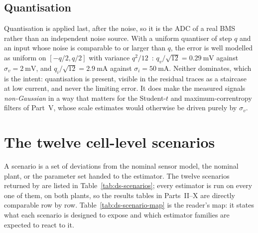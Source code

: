 \subsection{Quantisation}

Quantisation is applied last, after the noise, so it is the ADC of a real BMS rather than an
independent noise source. With a uniform quantiser of step $q$ and an input whose noise is
comparable to or larger than $q$, the error is well modelled as uniform on $[-q/2,q/2]$ with
variance $q^2/12$~\cite{widrow2008quantization}: $q_v/\sqrt{12} = \SI{0.29}{\milli\volt}$ against
$\sigma_v = \SI{2}{\milli\volt}$, and $q_i/\sqrt{12} = \SI{2.9}{\milli\ampere}$ against
$\sigma_i = \SI{50}{\milli\ampere}$. Neither dominates, which is the intent: quantisation is
present, visible in the residual traces as a staircase at low current, and never the limiting error.
It does make the measured signals \emph{non-Gaussian} in a way that matters for the Student-$t$ and
maximum-correntropy filters of Part~V, whose scale estimates would otherwise be driven purely by
$\sigma_v$.

\section{The twelve cell-level scenarios}
\label{sec:ds-scenarios}

A scenario is a set of deviations from the nominal sensor model, the nominal plant, or the
parameter set handed to the estimator. The twelve scenarios returned by
 are listed in Table~\ref{tab:ds-scenarios}; every estimator is run on
every one of them, on both plants, so the results tables in Parts~II--X are directly comparable
row by row. Table~\ref{tab:ds-scenario-map} is the reader's map: it states what each scenario is
designed to expose and which estimator families are expected to react to it.

